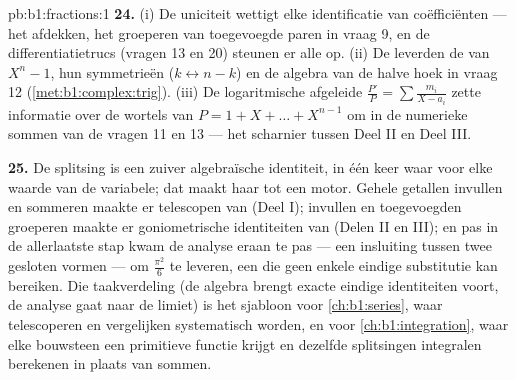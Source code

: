 \begin{solution}{pb:b1:fractions:1}
\textbf{24.} (i) De uniciteit wettigt elke identificatie van
coëfficiënten --- het afdekken, het groeperen van toegevoegde paren in
vraag 9, en de differentiatietrucs (vragen 13 en 20) steunen er alle op.
(ii) De  leverden de  van $X^n - 1$, hun symmetrieën
($k \leftrightarrow n-k$) en de algebra van de halve hoek in vraag 12
(\cref{met:b1:complex:trig}). (iii) De logaritmische afgeleide
$\frac{P'}P = \sum\frac{m_i}{X-a_i}$ zette informatie over de wortels van
$P = 1 + X + \dots + X^{n-1}$ om in de numerieke sommen van de vragen 11
en 13 --- het scharnier tussen Deel II en Deel III.

\textbf{25.} De splitsing is een zuiver algebraïsche identiteit, in één
keer waar voor elke waarde van de variabele; dat maakt haar tot een motor.
Gehele getallen invullen en sommeren maakte er telescopen van (Deel I);
 invullen en toegevoegden groeperen maakte er
goniometrische identiteiten van (Delen II en III); en pas in de allerlaatste
stap kwam de analyse eraan te pas --- een insluiting tussen twee gesloten
vormen --- om $\frac{\pi^2}6$ te leveren, een  die geen enkele
eindige substitutie kan bereiken. Die taakverdeling (de algebra brengt
exacte eindige identiteiten voort, de analyse gaat naar de limiet) is het
sjabloon voor \cref{ch:b1:series}, waar telescoperen en vergelijken
systematisch worden, en voor \cref{ch:b1:integration}, waar elke bouwsteen
een primitieve functie krijgt en dezelfde splitsingen integralen berekenen
in plaats van sommen.
\end{solution}
